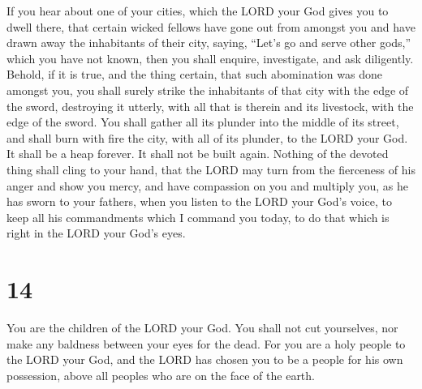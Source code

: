 If you hear about one of your cities, which the LORD your
God gives you to dwell there, that  certain wicked fellows
have gone out from amongst you and have drawn away the inhabitants of
their city, saying, ``Let's go and serve other gods,'' which you have
not known,  then you shall enquire, investigate, and ask
diligently. Behold, if it is true, and the thing certain, that such
abomination was done amongst you,  you shall surely strike
the inhabitants of that city with the edge of the sword, destroying it
utterly, with all that is therein and its livestock, with the edge of
the sword.  You shall gather all its plunder into the
middle of its street, and shall burn with fire the city, with all of its
plunder, to the LORD your God. It shall be a heap forever. It shall not
be built again.  Nothing of the devoted thing shall cling
to your hand, that the LORD may turn from the fierceness of his anger
and show you mercy, and have compassion on you and multiply you, as he
has sworn to your fathers,  when you listen to the LORD
your God's voice, to keep all his commandments which I command you
today, to do that which is right in the LORD your God's eyes.

\hypertarget{section-13}{%
\section{14}\label{section-13}}

 You are the children of the LORD your God. You shall not
cut yourselves, nor make any baldness between your eyes for the dead.
 For you are a holy people to the LORD your God, and the
LORD has chosen you to be a people for his own possession, above all
peoples who are on the face of the earth.

